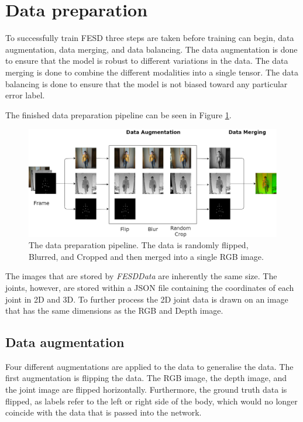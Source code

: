 \section{Data preparation}
\label{sec:data_preparation}

To successfully train FESD three steps are taken before training can begin, data augmentation, data merging, and data balancing. The data augmentation is done to ensure that the model is robust to different variations in the data. The data merging is done to combine the different modalities into a single tensor. The data balancing is done to ensure that the model is not biased toward any particular error label.

The finished data preparation pipeline can be seen in Figure \ref{fig:data_preparation_pipeline}.

\begin{figure}
  \centering
  \includegraphics[width=\linewidth]{figures/ProcessingPipeline/DataProcessing.png}
  \caption[Data preparation pipeline]{The data preparation pipeline. The data is randomly flipped, Blurred, and Cropped and then merged into a single RGB image.}
  \label{fig:data_preparation_pipeline}
\end{figure}

The images that are stored by \textit{FESDData} are inherently the same size. The joints, however, are stored within a JSON file containing the coordinates of each joint in 2D and 3D. To further process the 2D joint data is drawn on an image that
 has the same dimensions as the RGB and Depth image.

\subsection{Data augmentation}

Four different augmentations are applied to the data to generalise the data. The first augmentation is flipping the data. The RGB image, the depth image, and the joint image are flipped horizontally. Furthermore, the ground truth data is flipped, as labels refer to the left or right side of the body, which would no longer coincide with the data that is passed into the network.

